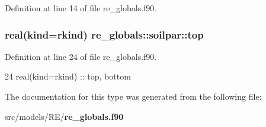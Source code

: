 Definition at line 14 of file re\+\_\+globals.\+f90.

\subsubsection[{top}]{\setlength{\rightskip}{0pt plus 5cm}real(kind=rkind) re\+\_\+globals\+::soilpar\+::top}\label{structre__globals_1_1soilpar_a9d44dfff5b77d0eda839957615d89934}


Definition at line 24 of file re\+\_\+globals.\+f90.


\begin{DoxyCode}
24     \textcolor{keywordtype}{real(kind=rkind)} :: top, bottom
\end{DoxyCode}


The documentation for this type was generated from the following file\+:\begin{DoxyCompactItemize}
\item 
src/models/\+R\+E/{\bf re\+\_\+globals.\+f90}\end{DoxyCompactItemize}
